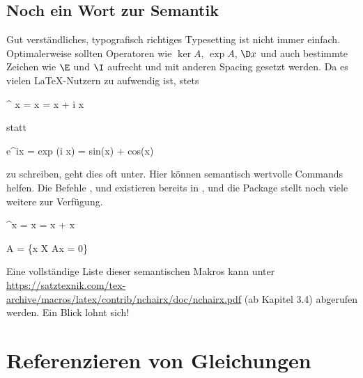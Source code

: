 \subsection{Noch ein Wort zur Semantik}
Gut verständliches, typografisch richtiges Typesetting ist nicht immer einfach.
Optimalerweise sollten Operatoren wie $\ker A$, $\exp A$, $\D x$ und auch bestimmte Zeichen wie $\E$ und $\I$ aufrecht und mit anderen Spacing gesetzt werden.
Da es vielen \LaTeX{}-Nutzern zu aufwendig ist, stets 
\begin{latexlisting}
	^{ x} =   x =  x + i  x
\end{latexlisting}
statt
\begin{latexlisting}
	e^{ix} = exp (i x) = sin(x) + cos(x)
\end{latexlisting}
zu schreiben, geht dies oft unter.
Hier können semantisch wertvolle Commands helfen. Die Befehle ,  und  existieren bereits in , und die Package  stellt noch viele weitere zur Verfügung.
\begin{latexlisting}
	\E^{\I x} = \exp \I x = \sin x + \cos x
\end{latexlisting}
\begin{latexlisting}
	\ker A = \{x \in X \mid Ax = 0\}
\end{latexlisting}
Eine vollständige Liste dieser semantischen Makros kann unter \url{https://satztexnik.com/tex-archive/macros/latex/contrib/nchairx/doc/nchairx.pdf} (ab Kapitel 3.4) abgerufen werden.
Ein Blick lohnt sich!

\section{Referenzieren von Gleichungen}

